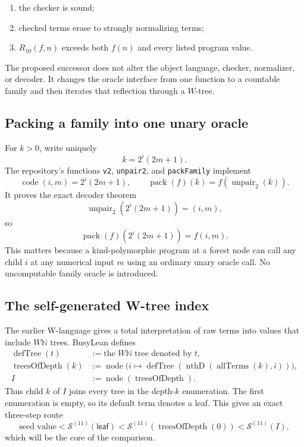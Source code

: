 \documentclass[11pt]{article}
\theoremstyle{definition}
\theoremstyle{remark}
\newcommand{\N}{\mathbb{N}}
\newcommand{\code}[1]{\texttt{#1}}
\newcommand{\Sstage}{\mathcal{S}^{(11)}}
\begin{document}
\begin{enumerate}
\item the checker is sound;
\item checked terms erase to strongly normalizing terms;
\item $R_{10}(f,n)$ exceeds both $f(n)$ and every listed program value.
\end{enumerate}

The proposed successor does not alter the object language, checker, normalizer,
or decoder.  It changes the oracle interface from one function to a countable
family and then iterates that reflection through a $W$-tree.

\subsection{Packing a family into one unary oracle}

For $k>0$, write uniquely
\[
  k=2^i(2m+1).
\]
The repository's functions \code{v2}, \code{unpair2}, and \code{packFamily}
implement
\[
  \operatorname{code}(i,m)=2^i(2m+1),\qquad
  \operatorname{pack}(f)(k)=f(\operatorname{unpair}_2(k)).
\]
It proves the exact decoder theorem
\[
  \operatorname{unpair}_2(2^i(2m+1))=(i,m),
\]
so
\[
  \operatorname{pack}(f)(2^i(2m+1))=f(i,m).
\]
This matters because a kind-polymorphic program at a forest node can call any
child $i$ at any numerical input $m$ using an ordinary unary oracle call.  No
uncomputable family oracle is introduced.

\subsection{The self-generated W-tree index}

The earlier W-language gives a total interpretation of raw terms into values
that include $W\N$ trees.  BusyLean defines
\[
\begin{aligned}
  \operatorname{defTree}(t) &:= \text{the }W\N\text{ tree denoted by }t,\\
  \operatorname{treesOfDepth}(k)
    &:= \operatorname{node}\bigl(i\mapsto
       \operatorname{defTree}(\operatorname{nthD}(\operatorname{allTerms}(k),i))\bigr),\\
  I &:= \operatorname{node}(\operatorname{treesOfDepth}).
\end{aligned}
\]
Thus child $k$ of $I$ joins every tree in the depth-$k$ enumeration.  The first
enumeration is empty, so its default term denotes a leaf.  This gives an exact
three-step route
\[
  \text{seed value}
  < \Sstage(\mathsf{leaf})
  < \Sstage(\operatorname{treesOfDepth}(0))
  < \Sstage(I),
\]
which will be the core of the comparison.
\end{document}
